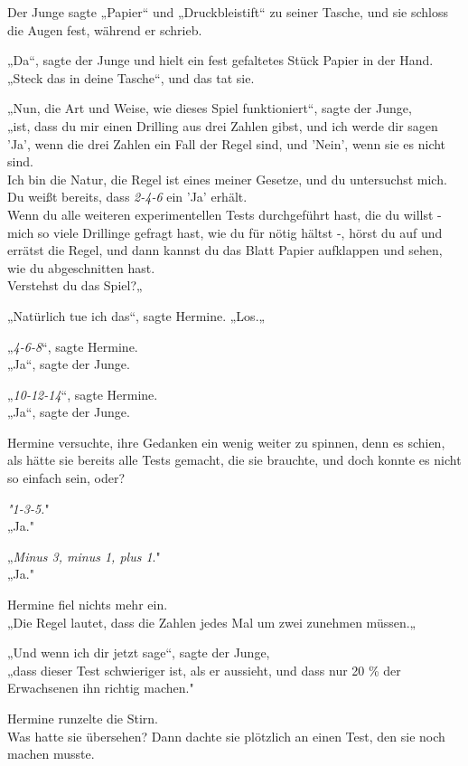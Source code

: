 {Der Junge sagte „Papier“ und „Druckbleistift“ zu seiner Tasche, und sie schloss die Augen fest, während er schrieb.

„Da“, sagte der Junge und hielt ein fest gefaltetes Stück Papier in der Hand.\\ „Steck das in deine Tasche“, und das tat sie.

„Nun, die Art und Weise, wie dieses Spiel funktioniert“, sagte der Junge,\\ „ist, dass du mir einen Drilling aus drei Zahlen gibst, und ich werde dir sagen 'Ja', wenn die drei Zahlen ein Fall der Regel sind, und 'Nein', wenn sie es nicht sind.\\ Ich bin die Natur, die Regel ist eines meiner Gesetze, und du untersuchst mich. Du weißt bereits, dass \emph{2-4-6} ein 'Ja' erhält.\\ Wenn du alle weiteren experimentellen Tests durchgeführt hast, die du willst - mich so viele Drillinge gefragt hast, wie du für nötig hältst -, hörst du auf und errätst die Regel, und dann kannst du das Blatt Papier aufklappen und sehen, wie du abgeschnitten hast.\\ Verstehst du das Spiel?„

„Natürlich tue ich das“, sagte Hermine. „Los.„

„\emph{4-6-8}“, sagte Hermine.\\ „Ja“, sagte der Junge.

„\emph{10-12-14}“, sagte Hermine.\\ „Ja“, sagte der Junge.

Hermine versuchte, ihre Gedanken ein wenig weiter zu spinnen, denn es schien, als hätte sie bereits alle Tests gemacht, die sie brauchte, und doch konnte es nicht so einfach sein, oder?

\emph{"1-3-5.}"\\ „Ja."

„\emph{Minus 3, minus 1, plus 1}."\\ „Ja."

Hermine fiel nichts mehr ein.\\ „Die Regel lautet, dass die Zahlen jedes Mal um zwei zunehmen müssen.„

„Und wenn ich dir jetzt sage“, sagte der Junge,\\ „dass dieser Test schwieriger ist, als er aussieht, und dass nur 20 \% der Erwachsenen ihn richtig machen."

Hermine runzelte die Stirn.\\ Was hatte sie übersehen? Dann dachte sie plötzlich an einen Test, den sie noch machen musste.

}
